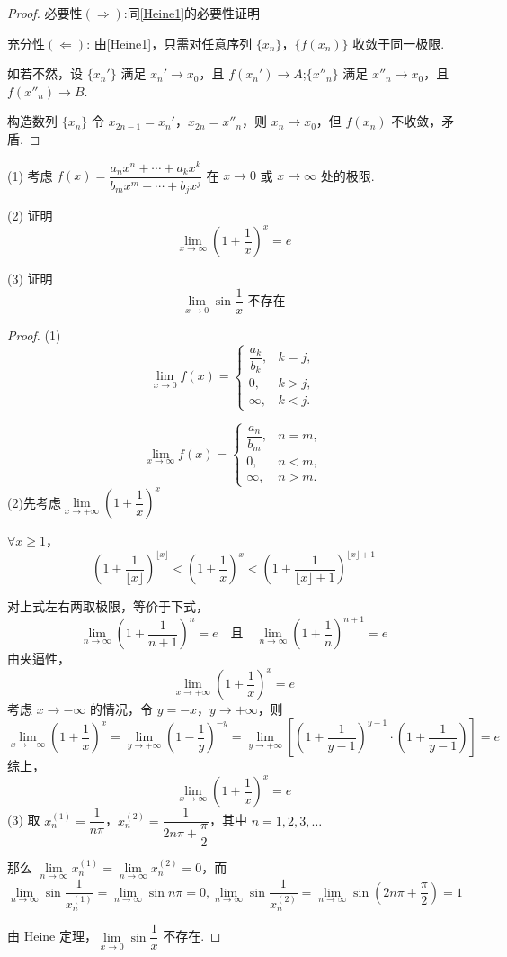\begin{proof}
	必要性$(\Rightarrow)$:同\ref{Heine1}的必要性证明
	
	充分性$(\Leftarrow)$:
	由\ref{Heine1}，只需对任意序列 $\{x_n\}$，$\{f(x_n)\}$ 收敛于同一极限.
	
	如若不然，设 $\{x_n'\}$ 满足 $x_n' \to x_0$，且 $f(x_n') \to A$;$\{x''_n\}$ 满足 $x''_n \to x_0$，且 $f(x''_n) \to B$.
	
	构造数列 $\{x_n\}$ 令 $x_{2n-1} = x_n'$，$x_{2n} = x''_n$，则 $x_n \to x_0$，但 $f(x_n)$ 不收敛，矛盾.
\end{proof}
\begin{example}
	(1) 考虑 $f(x) = \dfrac{a_n x^n + \cdots + a_k x^k}{b_m x^m + \cdots + b_j x^j}$ 在 $x \to 0$ 或 $x \to \infty$ 处的极限.
	
	(2) 证明
	\[
	\lim_{x \to \infty} \left(1 + \frac{1}{x}\right)^x = e
	\]
	
	(3) 证明
	\[
	\lim_{x \to 0} \sin \frac{1}{x} \text{ 不存在}
	\]
\end{example}
\begin{proof}
	(1)
	\[
	\lim_{x \to 0} f(x) =
	\begin{cases}
		\dfrac{a_k}{b_k}, & k = j, \\
		0, & k > j, \\
		\infty, & k < j.
	\end{cases}
	\]
	
	\[
	\lim_{x \to \infty} f(x) =
	\begin{cases}
		\dfrac{a_n}{b_m}, & n = m, \\
		0, & n < m, \\
		\infty, & n > m.
	\end{cases}
	\]
	(2)先考虑$\lim\limits_{x\to+\infty}(1+\dfrac{1}{x})^x$
	
	$\forall x \geqslant 1$，
	\[
	\left(1 + \frac{1}{\lfloor x \rfloor}\right)^{\lfloor x \rfloor} < \left(1 + \frac{1}{x}\right)^x < \left(1 + \frac{1}{\lfloor x \rfloor + 1}\right)^{\lfloor x \rfloor + 1}
	\]
	
	对上式左右两取极限，等价于下式，
	\[
	\lim_{n \to \infty} \left(1 + \frac{1}{n+1}\right)^{n} = e \quad \text{且} \quad \lim_{n \to \infty} \left(1 + \frac{1}{n}\right)^{n+1} = e
	\]
	由夹逼性，
	\[
	\lim_{x \to +\infty} \left(1 + \frac{1}{x}\right)^x = e
	\]
	考虑 $x \to -\infty$ 的情况，令 $y = -x$，$y \to +\infty$，则
	\[
	\lim_{x \to -\infty} \left(1 + \frac{1}{x}\right)^x = \lim_{y \to +\infty} \left(1 - \frac{1}{y}\right)^{-y} = \lim_{y \to +\infty} \left[\left(1 + \frac{1}{y-1}\right)^{y-1} \cdot \left(1 + \frac{1}{y-1}\right)\right] = e
	\]
	综上，
	\[
	\lim_{x \to \infty} \left(1 + \frac{1}{x}\right)^x = e
	\]
	(3) 取 $x_n^{(1)} = \dfrac{1}{n\pi}$，$x_n^{(2)} = \dfrac{1}{2n\pi + \dfrac{\pi}{2}}$，其中 $n = 1, 2, 3, \ldots$
	
	那么 $\lim\limits_{n \to \infty} x_n^{(1)} = \lim\limits_{n \to \infty} x_n^{(2)} = 0$，而 
	$$\lim_{n \to \infty} \sin \frac{1}{x_n^{(1)}} = \lim_{n \to \infty} \sin n\pi = 0,\lim_{n \to \infty} \sin \frac{1}{x_n^{(2)}} = \lim_{n \to \infty} \sin \left(2n\pi + \frac{\pi}{2}\right) = 1$$
	
	由 Heine 定理，$\lim\limits_{x \to 0} \sin \dfrac{1}{x}$ 不存在.
\end{proof}
